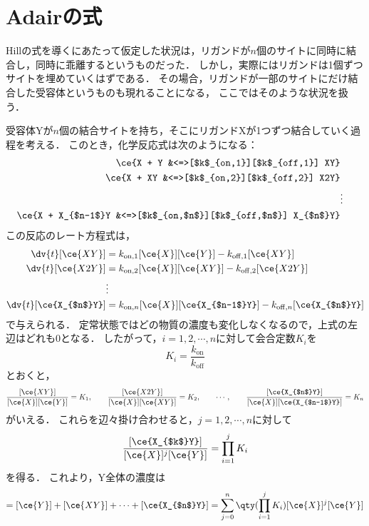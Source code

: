 \section{Adairの式}
Hillの式を導くにあたって仮定した状況は，リガンドが$n$個のサイトに同時に結合し，同時に乖離するというものだった．
しかし，実際にはリガンドは1個ずつサイトを埋めていくはずである．
その場合，リガンドが一部のサイトにだけ結合した受容体というものも現れることになる，
ここではそのような状況を扱う．

受容体Yが$n$個の結合サイトを持ち，そこにリガンドXが1つずつ結合していく過程を考える．
このとき，化学反応式は次のようになる：
\begin{align*}
  \ce{X + Y &<=>[$k$_{on,1}][$k$_{off,1}] XY} \\
  \ce{X + XY &<=>[$k$_{on,2}][$k$_{off,2}] X2Y} \\
  &\vdots\\
  \ce{X + X_{$n-1$}Y &<=>[$k$_{on,$n$}][$k$_{off,$n$}] X_{$n$}Y} 
\end{align*}
この反応のレート方程式は，
\begin{align*}
  \dv{t}[\ce{XY}] &= k_{\mathrm{on},1}[\ce{X}][\ce{Y}] - k_{\mathrm{off},1}[\ce{XY}] \\
  \dv{t}[\ce{X2Y}] &= k_{\mathrm{on},2}[\ce{X}][\ce{XY}] - k_{\mathrm{off},2}[\ce{X2Y}] \\
  &\vdots\\
  \dv{t}[\ce{X_{$n$}Y}] &= k_{\mathrm{on},n}[\ce{X}][\ce{X_{$n-1$}Y}] - k_{\mathrm{off},n}[\ce{X_{$n$}Y}]
\end{align*}
で与えられる．
定常状態ではどの物質の濃度も変化しなくなるので，上式の左辺はどれも0となる．
したがって，$i=1,2,\cdots,n$に対して会合定数$K_i$を
\begin{equation}
  K_i = \frac{k_{\mathrm{on}}}{k_{\mathrm{off}}}
\end{equation}
とおくと，
\begin{equation}
  \frac{[\ce{XY}]}{[\ce{X}][\ce{Y}]} = K_1, \qquad \frac{[\ce{X2Y}]}{[\ce{X}][\ce{XY}]} = K_2, \qquad\cdots,\qquad \frac{[\ce{X_{$n$}Y}]}{[\ce{X}][\ce{X_{$n-1$}Y}]} = K_n
\end{equation}
がいえる．
これらを辺々掛け合わせると，$j=1,2,\cdots, n$に対して
\begin{equation}
  \frac{[\ce{X_{$k$}Y}]}{[\ce{X}]^j[\ce{Y}]} = \prod_{i=1}^{j} K_i
\end{equation}
を得る．
これより，Y全体の濃度は
\begin{equation}
  [\ce{Y_{total}}] = [\ce{Y}] + [\ce{XY}] + \cdots + [\ce{X_{$n$}Y}] = \sum_{j=0}^{n} \qty(\prod_{i=1}^{j} K_i )[\ce{X}]^j[\ce{Y}] 
\end{equation}
